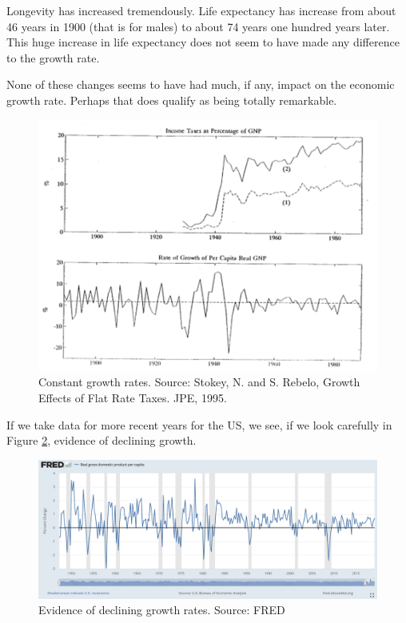 \documentclass[
]{book}
\begin{document}
Longevity has increased tremendously. Life expectancy has increase from about 46 years in 1900 (that is for males) to about 74 years one hundred years later. This huge increase in life expectancy does not seem to have made any difference to the growth rate.

None of these changes seems to have had much, if any, impact on the economic growth rate. Perhaps that does qualify as being totally remarkable.

\begin{figure}

{\centering \includegraphics[width=1\linewidth]{img/growth/growth12} 

}

\caption{Constant growth rates. Source: Stokey, N. and S. Rebelo, Growth Effects of Flat Rate Taxes. JPE, 1995.}\label{fig:growth12}
\end{figure}

If we take data for more recent years for the US, we see, if we look carefully in Figure \ref{fig:growth13}, evidence of declining growth.

\begin{figure}

{\centering \includegraphics[width=1\linewidth]{img/growth/growth13} 

}

\caption{Evidence of declining growth rates. Source: FRED}\label{fig:growth13}
\end{figure}
\end{document}
